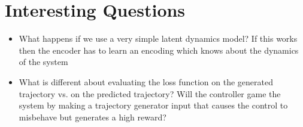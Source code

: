 \documentclass{article}
\begin{document}



\section{Interesting Questions}

\begin{itemize}
    \item What happens if we use a very simple latent dynamics model? If this works then the encoder has to learn an encoding which knows about the dynamics of the system
    \item What is different about evaluating the loss function on the generated trajectory vs. on the predicted trajectory? Will the controller game the system by making a trajectory generator input that causes the control to misbehave but generates a high reward?
\end{itemize}
\end{document}

